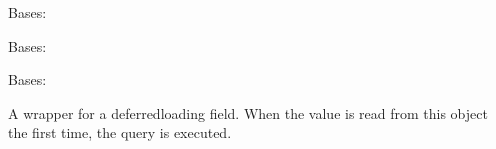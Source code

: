 \documentclass[letterpaper,10pt,spanish]{sphinxmanual}
\begin{document}
\begin{fulllineitems}
\label{\detokenize{myapp:myapp.models.Task}}
\pysigstartsignatures
\pysiglinewithargsret
{}
{\sphinxparamcomma {}\sphinxparamcomma {}\sphinxparamcomma {}\sphinxparamcomma {}\sphinxparamcomma {}\sphinxparamcomma {}\sphinxparamcomma {}}
{}
\pysigstopsignatures
\sphinxAtStartPar
Bases: 

\begin{fulllineitems}
\label{\detokenize{myapp:myapp.models.Task.DoesNotExist}}
\pysigstartsignatures
\pysigline
{}
\pysigstopsignatures
\sphinxAtStartPar
Bases: 

\end{fulllineitems}


\begin{fulllineitems}
\label{\detokenize{myapp:myapp.models.Task.MultipleObjectsReturned}}
\pysigstartsignatures
\pysigline
{}
\pysigstopsignatures
\sphinxAtStartPar
Bases: 

\end{fulllineitems}


\begin{fulllineitems}
\label{\detokenize{myapp:myapp.models.Task.created}}
\pysigstartsignatures
\pysigline
{}
\pysigstopsignatures
\sphinxAtStartPar
A wrapper for a deferred\sphinxhyphen{}loading field. When the value is read from this
object the first time, the query is executed.


\end{fulllineitems}
\end{fulllineitems}
\end{document}
